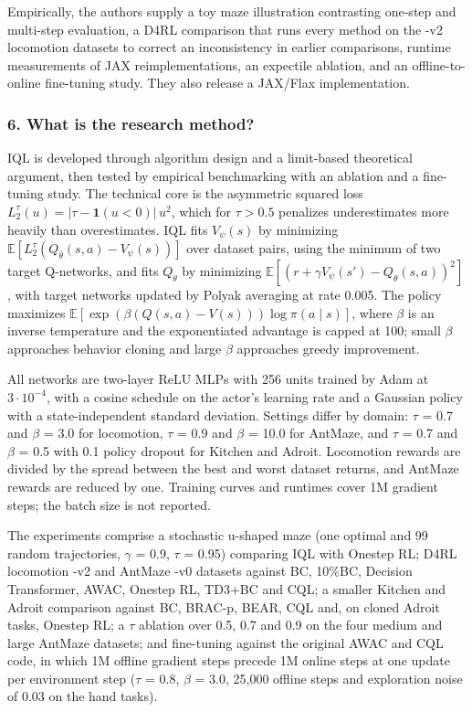 \documentclass[11pt]{article}
\newcommand{\question}[1]{\subsubsection*{#1}}
\begin{document}
Empirically, the authors supply a toy maze illustration contrasting one-step and multi-step evaluation, a D4RL comparison that runs every method on the -v2 locomotion datasets to correct an inconsistency in earlier comparisons, runtime measurements of JAX reimplementations, an expectile ablation, and an offline-to-online fine-tuning study. They also release a JAX/Flax implementation.

\question{6. What is the research method?}

IQL is developed through algorithm design and a limit-based theoretical argument, then tested by empirical benchmarking with an ablation and a fine-tuning study. The technical core is the asymmetric squared loss $L_2^{\tau}(u)=\lvert\tau-\mathbf{1}(u<0)\rvert\,u^{2}$, which for $\tau>0.5$ penalizes underestimates more heavily than overestimates. IQL fits $V_{\psi}(s)$ by minimizing $\mathbb{E}[L_2^{\tau}(Q_{\hat{\theta}}(s,a)-V_{\psi}(s))]$ over dataset pairs, using the minimum of two target Q-networks, and fits $Q_{\theta}$ by minimizing $\mathbb{E}[(r+\gamma V_{\psi}(s')-Q_{\theta}(s,a))^{2}]$, with target networks updated by Polyak averaging at rate 0.005. The policy maximizes $\mathbb{E}[\exp(\beta(Q(s,a)-V(s)))\log\pi(a\mid s)]$, where \ensuremath{\beta} is an inverse temperature and the exponentiated advantage is capped at 100; small \ensuremath{\beta} approaches behavior cloning and large \ensuremath{\beta} approaches greedy improvement.

All networks are two-layer ReLU MLPs with 256 units trained by Adam at $3\cdot10^{-4}$, with a cosine schedule on the actor's learning rate and a Gaussian policy with a state-independent standard deviation. Settings differ by domain: \ensuremath{\tau} = 0.7 and \ensuremath{\beta} = 3.0 for locomotion, \ensuremath{\tau} = 0.9 and \ensuremath{\beta} = 10.0 for AntMaze, and \ensuremath{\tau} = 0.7 and \ensuremath{\beta} = 0.5 with 0.1 policy dropout for Kitchen and Adroit. Locomotion rewards are divided by the spread between the best and worst dataset returns, and AntMaze rewards are reduced by one. Training curves and runtimes cover 1M gradient steps; the batch size is not reported.

The experiments comprise a stochastic u-shaped maze (one optimal and 99 random trajectories, \ensuremath{\gamma} = 0.9, \ensuremath{\tau} = 0.95) comparing IQL with Onestep RL; D4RL locomotion -v2 and AntMaze -v0 datasets against BC, 10\%BC, Decision Transformer, AWAC, Onestep RL, TD3+BC and CQL; a smaller Kitchen and Adroit comparison against BC, BRAC-p, BEAR, CQL and, on cloned Adroit tasks, Onestep RL; a \ensuremath{\tau} ablation over 0.5, 0.7 and 0.9 on the four medium and large AntMaze datasets; and fine-tuning against the original AWAC and CQL code, in which 1M offline gradient steps precede 1M online steps at one update per environment step (\ensuremath{\tau} = 0.8, \ensuremath{\beta} = 3.0, 25,000 offline steps and exploration noise of 0.03 on the hand tasks).
\end{document}
